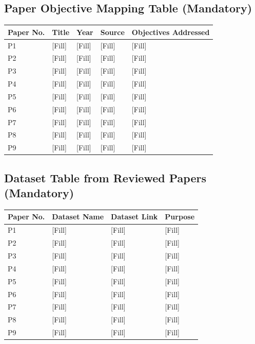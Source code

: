 \documentclass[12pt,a4paper]{article}
\begin{document}
\subsection{Paper Objective Mapping Table (Mandatory)}
\begin{longtable}{p{}p{}p{}p{}p{}}
\toprule
\textbf{Paper No.} & \textbf{Title} & \textbf{Year} & \textbf{Source} & \textbf{Objectives Addressed} \\
\midrule
P1 & [Fill] & [Fill] & [Fill] & [Fill] \\
P2 & [Fill] & [Fill] & [Fill] & [Fill] \\
P3 & [Fill] & [Fill] & [Fill] & [Fill] \\
P4 & [Fill] & [Fill] & [Fill] & [Fill] \\
P5 & [Fill] & [Fill] & [Fill] & [Fill] \\
P6 & [Fill] & [Fill] & [Fill] & [Fill] \\
P7 & [Fill] & [Fill] & [Fill] & [Fill] \\
P8 & [Fill] & [Fill] & [Fill] & [Fill] \\
P9 & [Fill] & [Fill] & [Fill] & [Fill] \\
\bottomrule
\end{longtable}

\subsection{Dataset Table from Reviewed Papers (Mandatory)}
\begin{longtable}{p{}p{}p{}p{}}
\toprule
\textbf{Paper No.} & \textbf{Dataset Name} & \textbf{Dataset Link} & \textbf{Purpose} \\
\midrule
P1 & [Fill] & [Fill] & [Fill] \\
P2 & [Fill] & [Fill] & [Fill] \\
P3 & [Fill] & [Fill] & [Fill] \\
P4 & [Fill] & [Fill] & [Fill] \\
P5 & [Fill] & [Fill] & [Fill] \\
P6 & [Fill] & [Fill] & [Fill] \\
P7 & [Fill] & [Fill] & [Fill] \\
P8 & [Fill] & [Fill] & [Fill] \\
P9 & [Fill] & [Fill] & [Fill] \\
\bottomrule
\end{longtable}
\end{document}
